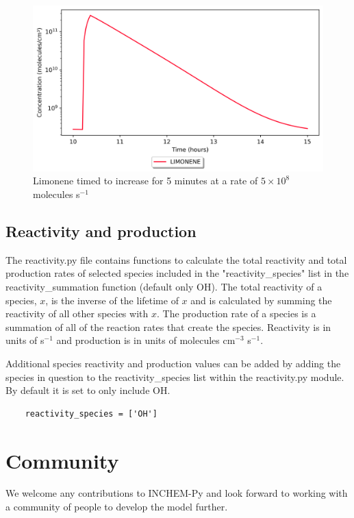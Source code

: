 \documentclass[a4paper]{refart}
\begin{document}
\clearpage
\begin{figure}[h!]
    \centering
    \includegraphics[width=\textwidth]{timed_limonene.png}
    \caption{Limonene timed to increase for 5 minutes at a rate of $5\times10^8$ molecules s$^{-1}$}
    \label{fig:timed_limonene}
\end{figure}

\subsection{Reactivity and production}\label{reactivity.py}
The reactivity.py file contains functions to calculate the total reactivity and total production rates of selected species included in the "reactivity\_species" list in the reactivity\_summation function (default only OH). The total reactivity of a species, $x$, is the inverse of the lifetime of $x$ and is calculated by summing the reactivity of all other species with $x$. The production rate of a species is a summation of all of the reaction rates that create the species. Reactivity is in units of s$^{-1}$ and production is in units of molecules cm$^{-3}$ s$^{-1}$.

Additional species reactivity and production values can be added by adding the species in question to the reactivity\_species list within the reactivity.py module. By default it is set to only include OH.
\begin{verbatim}
    reactivity_species = ['OH']
\end{verbatim}

\section{Community}
We welcome any contributions to INCHEM-Py and look forward to working with a community of people to develop the model further. 
\end{document}

